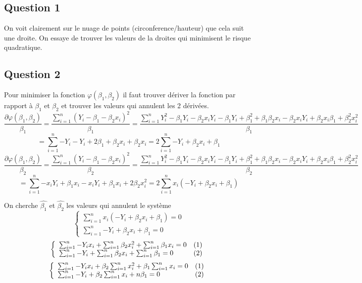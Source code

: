 \documentclass[]{book}
\theoremstyle{definition}
\begin{document}
\subsection*{Question 1}
On voit clairement sur le nuage de points (circonference/hauteur) que cela suit une droite. On essaye de trouver les valeurs de la droites qui minimisent le risque quadratique.

\subsection*{Question 2}
Pour minimiser la fonction $\varphi(\beta_1, \beta_2)$ il faut trouver d\'eriver la fonction par rapport \`a $\beta_1$ et $\beta_2$ et trouver les valeurs qui annulent les 2 d\'eriv\'ees.
$$
\frac{\partial \varphi(\beta_1, \beta_2)}{\beta_1} = \frac{\sum_{i=1}^{n}{(Y_i - \beta_1 - \beta_2x_i)^2}}{\beta_1} = \frac{\sum_{i=1}^{n}{Y_i^2 - \beta_1Y_i - \beta_2x_iY_i -\beta_1Y_i + \beta_1^2 + \beta_1\beta_2x_i - \beta_2x_iY_i + \beta_2x_i\beta_1 +\beta_2^2x_i^2}}{\beta_1}
$$
$$
= \sum_{i=1}^{n}{-Y_i -Y_i +2\beta_1 +\beta_2x_i+\beta_2x_i} = 2 \sum_{i=1}^{n}{-Y_i+\beta_2x_i+\beta_1}
$$
$$
\frac{\partial \varphi(\beta_1, \beta_2)}{\beta_2} = \frac{\sum_{i=1}^{n}{(Y_i - \beta_1 - \beta_2x_i)^2}}{\beta_2} = \frac{\sum_{i=1}^{n}{Y_i^2 - \beta_1Y_i - \beta_2x_iY_i -\beta_1Y_i + \beta_1^2 + \beta_1\beta_2x_i - \beta_2x_iY_i + \beta_2x_i\beta_1 +\beta_2^2x_i^2}}{\beta_2}
$$
$$
= \sum_{i=1}^{n}{-x_iY_i+\beta_1x_i-x_iY_i + \beta_1x_i+2\beta_2x_i^2} = 2 \sum_{i=1}^{n}{x_i(-Y_i+\beta_2x_i+\beta_1)}
$$

On cherche $\hat{\beta_1}$ et $\hat{\beta_2}$ les valeurs qui annulent le syst\`eme
$$
\left\{
\begin{array}{l}
\sum_{i=1}^{n}{x_i(-Y_i+\beta_2x_i+\beta_1)} = 0 \\
\sum_{i=1}^{n}{-Y_i+\beta_2x_i+\beta_1} = 0
\end{array}
\right.
$$
$$
\left\{
\begin{array}{l l}
\sum_{i=1}^{n}{-Y_ix_i}+\sum_{i=1}^{n}{\beta_2x_i^2}+\sum_{i=1}^{n}{\beta_1x_i} = 0 & (1)\\
\sum_{i=1}^{n}{-Y_i} +\sum_{i=1}^{n}{\beta_2x_i}+\sum_{i=1}^{n}{\beta_1} = 0 & (2)
\end{array}
\right.
$$
$$
\left\{
\begin{array}{l l}
\sum_{i=1}^{n}{-Y_ix_i}+\beta_2\sum_{i=1}^{n}{x_i^2}+\beta_1\sum_{i=1}^{n}{x_i} = 0 & (1)\\
\sum_{i=1}^{n}{-Y_i} +\beta_2\sum_{i=1}^{n}{x_i}+n\beta_1 = 0 & (2)
\end{array}
\right.
$$
\end{document}
